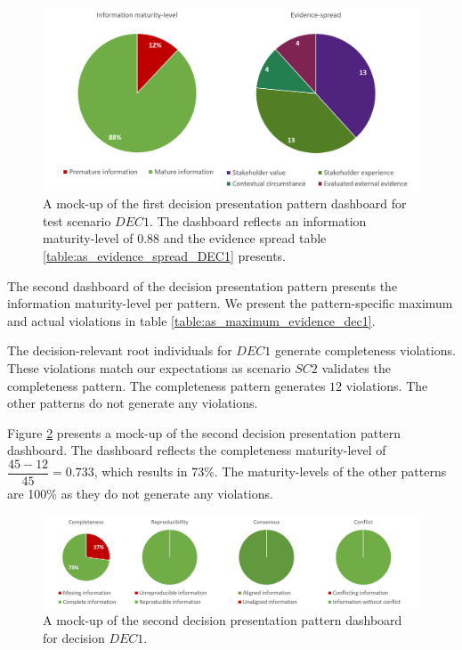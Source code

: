 \begin{figure}[H]
\centering
  \includegraphics[width=14cm]{../../Images/05_Validation/05_AS_Dashboard_Component_1_AS_DEC1.png}
  \caption{A mock-up of the first decision presentation pattern dashboard for test scenario $DEC1$. The dashboard reflects an information maturity-level of $0.88$ and the evidence spread table \ref{table:as_evidence_spread_DEC1} presents.}
  \label{fig:05_AS_Dashboard_Component_1_AS_DEC1}
\end{figure}

The second dashboard of the decision presentation pattern presents the information maturity-level per pattern. We present the pattern-specific maximum and actual violations in table \ref{table:as_maximum_evidence_dec1}.

The decision-relevant root individuals for $DEC1$ generate completeness violations. These violations match our expectations as scenario $SC2$ validates the completeness pattern. The completeness pattern generates $12$ violations. The other patterns do not generate any violations.

Figure \ref{fig:05_AS_Dashboard_Component_2_AS_DEC1} presents a mock-up of the second decision presentation pattern dashboard. The dashboard reflects the completeness maturity-level of $\dfrac{45-12}{45} = 0.733$, which results in 73\%. The maturity-levels of the other patterns are 100\% as they do not generate any violations.

\begin{figure}[H]
\centering
  \includegraphics[width=17cm]{../../Images/05_Validation/05_AS_Dashboard_Component_2_AS_DEC1.png}
  \caption{A mock-up of the second decision presentation pattern dashboard for decision $DEC1$.}
  \label{fig:05_AS_Dashboard_Component_2_AS_DEC1}
\end{figure}

